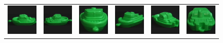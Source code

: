 \begin{figure}[p]
\begin{tabular}{cccccc}
\includegraphics[width=2cm]{coil/beeld-54.eps} &
\includegraphics[width=2cm]{coil/beeld-55.eps} &
\includegraphics[width=2cm]{coil/beeld-56.eps} &
\includegraphics[width=2cm]{coil/beeld-57.eps} &
\includegraphics[width=2cm]{coil/beeld-58.eps} &
\includegraphics[width=2cm]{coil/beeld-59.eps} \\


\end{tabular}
\end{figure}

